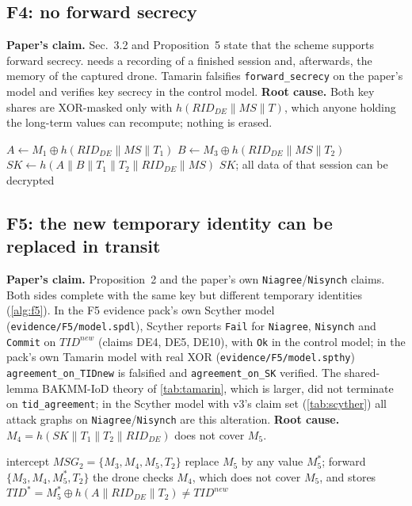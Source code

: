 \subsection{F4: no forward secrecy}\label{sec:f4}
\textbf{Paper's claim.} Sec.~3.2 and Proposition~5 state that the scheme supports forward secrecy.
 needs a recording of a finished session and, afterwards, the memory of the captured drone. Tamarin falsifies
\texttt{forward\_secrecy} on the paper's model and verifies key secrecy in the control model.
\textbf{Root cause.} Both key shares are XOR-masked only with $h(RID_{DE}\|MS\|T)$, which anyone holding the long-term values
can recompute; nothing is erased.
\begin{algorithm}[!htbp]
\caption{F4: recovering the key of a recorded session after drone capture}\label{alg:f4}
$A \leftarrow M_1 \oplus h(RID_{DE}\|MS\|T_1)$\;
$B \leftarrow M_3 \oplus h(RID_{DE}\|MS\|T_2)$\;
$SK \leftarrow h(A\|B\|T_1\|T_2\|RID_{DE}\|MS)$\;
\Return $SK$; all data of that session can be decrypted\;
\end{algorithm}

\subsection{F5: the new temporary identity can be replaced in transit}\label{sec:f5}
\textbf{Paper's claim.} Proposition~2 and the paper's own \texttt{Niagree}/\texttt{Nisynch} claims.
Both sides complete with the same key but different temporary identities (\cref{alg:f5}). In the F5 evidence pack's own
Scyther model (\texttt{evidence/F5/model.spdl}), Scyther reports \texttt{Fail} for \texttt{Niagree}, \texttt{Nisynch} and
\texttt{Commit} on $TID^{new}$ (claims DE4, DE5, DE10), with \texttt{Ok} in the control model; in the pack's own Tamarin model
with real XOR (\texttt{evidence/F5/model.spthy}) \texttt{agreement\_on\_TIDnew} is falsified and \texttt{agreement\_on\_SK}
verified. The shared-lemma BAKMM-IoD theory of \cref{tab:tamarin}, which is larger, did not terminate on \texttt{tid\_agreement};
in the Scyther model with v3's claim set (\cref{tab:scyther}) all attack graphs on \texttt{Niagree}/\texttt{Nisynch} are this
alteration. \textbf{Root cause.} $M_4 = h(SK\|T_1\|T_2\|RID_{DE})$ does not cover $M_5$.
\begin{algorithm}[!htbp]
\caption{F5: replacing $TID^{new}$}\label{alg:f5}
intercept $MSG_2=\{M_3,M_4,M_5,T_2\}$\;
replace $M_5$ by any value $M_5^{*}$; forward $\{M_3,M_4,M_5^{*},T_2\}$\;
the drone checks $M_4$, which does not cover $M_5$, and stores $TID^{*} = M_5^{*}\oplus h(A\|RID_{DE}\|T_2)\neq TID^{new}$\;
\end{algorithm}

